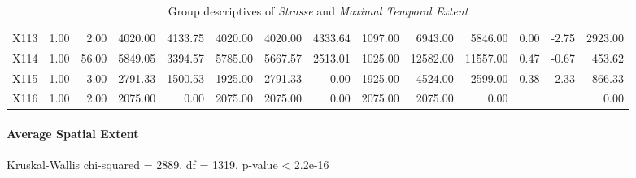 \begin{table}[ht!]
\begin{tabular}{rrrrrrrrrrrrrr}
    X113 & 1.00 & 2.00 & 4020.00 & 4133.75 & 4020.00 & 4020.00 & 4333.64 & 1097.00 & 6943.00 & 5846.00 & 0.00 & -2.75 & 2923.00 \\ 
    X114 & 1.00 & 56.00 & 5849.05 & 3394.57 & 5785.00 & 5667.57 & 2513.01 & 1025.00 & 12582.00 & 11557.00 & 0.47 & -0.67 & 453.62 \\ 
    X115 & 1.00 & 3.00 & 2791.33 & 1500.53 & 1925.00 & 2791.33 & 0.00 & 1925.00 & 4524.00 & 2599.00 & 0.38 & -2.33 & 866.33 \\ 
    X116 & 1.00 & 2.00 & 2075.00 & 0.00 & 2075.00 & 2075.00 & 0.00 & 2075.00 & 2075.00 & 0.00 &  &  & 0.00 \\ 
     \hline
  \end{tabular}
	\caption{Group descriptives of \textit{Strasse} and \textit{Maximal Temporal Extent}}
	\label{tbl:descriptives_baysis_matched_Strasse_TMax}
\end{table}

\paragraph{Average Spatial Extent}
Kruskal-Wallis chi-squared = 2889, df = 1319, p-value < 2.2e-16

